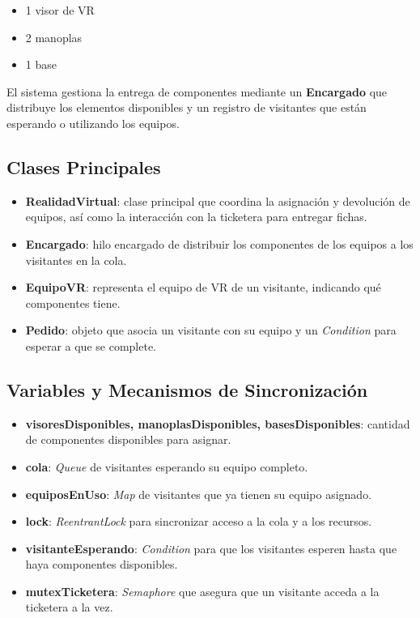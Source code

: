 \documentclass[12pt,a4paper]{article}
\begin{document}
\begin{itemize}
    \item 1 visor de VR
    \item 2 manoplas
    \item 1 base
\end{itemize}

El sistema gestiona la entrega de componentes mediante un \textbf{Encargado} que distribuye los elementos disponibles y un registro de visitantes que están esperando o utilizando los equipos.

\subsection{Clases Principales}
\begin{itemize}
    \item \textbf{RealidadVirtual}: clase principal que coordina la asignación y devolución de equipos, así como la interacción con la ticketera para entregar fichas.
    \item \textbf{Encargado}: hilo encargado de distribuir los componentes de los equipos a los visitantes en la cola.
    \item \textbf{EquipoVR}: representa el equipo de VR de un visitante, indicando qué componentes tiene.
    \item \textbf{Pedido}: objeto que asocia un visitante con su equipo y un \textit{Condition} para esperar a que se complete.
\end{itemize}

\subsection{Variables y Mecanismos de Sincronización}

\begin{itemize}
    \item \textbf{visoresDisponibles, manoplasDisponibles, basesDisponibles}: cantidad de componentes disponibles para asignar.
    \item \textbf{cola}: \textit{Queue} de visitantes esperando su equipo completo.
    \item \textbf{equiposEnUso}: \textit{Map} de visitantes que ya tienen su equipo asignado.
    \item \textbf{lock}: \textit{ReentrantLock} para sincronizar acceso a la cola y a los recursos.
    \item \textbf{visitanteEsperando}: \textit{Condition} para que los visitantes esperen hasta que haya componentes disponibles.
    \item \textbf{mutexTicketera}: \textit{Semaphore} que asegura que un visitante acceda a la ticketera a la vez.
\end{itemize}
\end{document}
